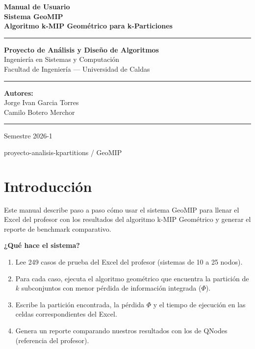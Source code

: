 \documentclass[12pt,a4paper]{article}
\begin{document}
\begin{titlepage}
    \centering
    \vspace*{1cm}
    {\Huge\bfseries\color{primary} Manual de Usuario\\[0.5em]
    \Large Sistema GeoMIP\\[0.3em]
    \large Algoritmo k-MIP Geométrico para k-Particiones}
    \vspace{1.5cm}

    \rule{\linewidth}{2pt}
    \vspace{0.5cm}

    {\large\textbf{Proyecto de Análisis y Diseño de Algoritmos}}\\[0.3em]
    {\large Ingeniería en Sistemas y Computación}\\[0.3em]
    {\large Facultad de Ingeniería — Universidad de Caldas}
    \vspace{1cm}

    \rule{\linewidth}{0.5pt}
    \vspace{0.8cm}

    {\large\textbf{Autores:}}\\[0.5em]
    {\large Jorge Ivan Garcia Torres}\\[0.3em]
    {\large Camilo Botero Merchor}
    \vspace{1cm}

    \rule{\linewidth}{0.5pt}
    \vspace{0.5cm}
    {\large Semestre 2026-1}

    \vfill
    {\small\color{gray} proyecto-analisis-kpartitions / GeoMIP}
\end{titlepage}

\tableofcontents
\newpage

\section{Introducción}

Este manual describe paso a paso cómo usar el sistema GeoMIP para llenar el Excel del profesor con los resultados del algoritmo k-MIP Geométrico y generar el reporte de benchmark comparativo.

\textbf{¿Qué hace el sistema?}
\begin{enumerate}
    \item Lee 249 casos de prueba del Excel del profesor (sistemas de 10 a 25 nodos).
    \item Para cada caso, ejecuta el algoritmo geométrico que encuentra la partición de $k$ subconjuntos con menor pérdida de información integrada ($\Phi$).
    \item Escribe la partición encontrada, la pérdida $\Phi$ y el tiempo de ejecución en las celdas correspondientes del Excel.
    \item Genera un reporte comparando nuestros resultados con los de QNodes (referencia del profesor).
\end{enumerate}
\end{document}
